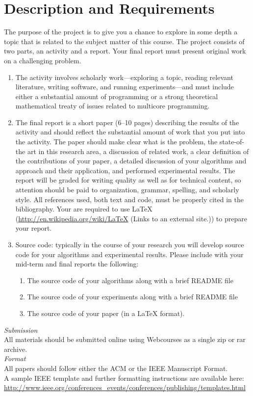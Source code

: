 \documentclass{article}
\begin{document}
\section{Description and Requirements}
The purpose of the project is to give you a chance to explore in some depth a topic that is related to the subject matter of this course. The project consists of two parts, an activity and a report. Your final report must present original work on a challenging problem.
\begin{enumerate}
    \item The activity involves scholarly work—exploring a topic, reading relevant literature, writing software, and running experiments—and must include either a substantial amount of programming or a strong theoretical mathematical treaty of issues related to multicore programming.
    \item The final report is a short paper (6–10 pages) describing the results of the activity and should reflect the substantial amount of work that you put into the activity. The paper should make clear what is the problem, the state-of-the art in this research area, a discussion of related work, a clear definition of the contributions of your paper, a detailed discussion of your algorithms and approach and their application, and performed experimental results. The report will be graded for writing quality as well as for technical content, so attention should be paid to organization, grammar, spelling, and scholarly style. All references used, both text and code, must be properly cited in the bibliography. Your are required to use LaTeX (\url{http://en.wikipedia.org/wiki/LaTeX} (Links to an external site.)) to prepare your report.
    \item Source code: typically in the course of your research you will develop source code for your algorithms and experimental results. Please include with your mid-term and final reports the following:
    \begin{enumerate}
        \item The source code of your algorithms along with a brief README file
        \item The source code of your experiments along with a brief README file
        \item The source code of your paper (in a LaTeX format).
    \end{enumerate}
\end{enumerate}
\textit{Submission} \\
All materials should be submitted online using Webcourses as a single zip or rar archive. \\
\textit{Format} \\
All papers should follow either the ACM or the IEEE Manuscript Format. \\
A sample IEEE template and further formatting instructions are available here: \\
\url{http://www.ieee.org/conferences_events/conferences/publishing/templates.html}
\end{document}
